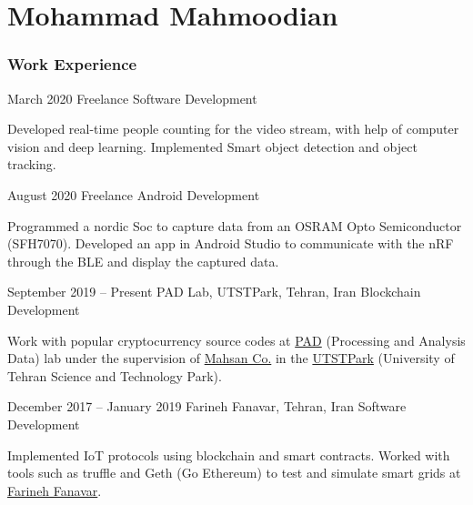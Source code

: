 \documentclass{tccv}
\begin{document}
\part{Mohammad Mahmoodian}
\section{Work Experience}

\begin{eventlist}

\item{March 2020}
	{Freelance}
	{Software Development}

	Developed real-time people counting for the video stream, with help of computer vision and deep learning. Implemented Smart object detection and object tracking.

\item{August 2020}
	{Freelance}
	{Android Development}

	Programmed a nordic Soc to capture data from an OSRAM Opto Semiconductor (SFH7070). Developed an app in Android Studio to communicate with the nRF through the BLE and display the captured data.

%


\item{September 2019 -- Present}
     {PAD Lab, UTSTPark, Tehran, Iran}
     {Blockchain Development}
     
	Work with popular cryptocurrency source codes at \href{www.padlab.ir}{PAD} (Processing and Analysis Data) lab under the supervision of \href{www.mahsan.co}{Mahsan Co.} in the \href{www.utstpark.ir}{UTSTPark} (University of Tehran Science and Technology Park).

%

%

\item{December 2017 -- January 2019}
     {Farineh Fanavar, Tehran, Iran}
     {Software Development}

	Implemented IoT protocols using blockchain and smart contracts. Worked with tools such as truffle and Geth (Go Ethereum) to test and simulate smart grids at \href{http://farinehtech.com/}{Farineh Fanavar}.

\end{eventlist}
\end{document}
